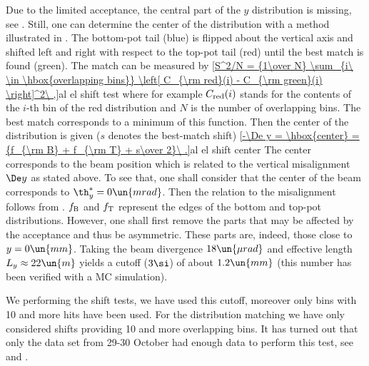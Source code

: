 
Due to the limited acceptance, the central part of the $y$ distribution is missing, see . Still, one can determine the center of the distribution with a method illustrated in . The bottom-pot tail (blue) is flipped about the vertical axis and shifted left and right with respect to the top-pot tail (red) until the best match is found (green). The match can be measured by
\eqref{S^2/N = {1\over N} \sum_{i\ \in \hbox{overlapping bins}} \left[ C_{\rm red}(i) - C_{\rm green}(i) \right]^2\ ,}{al el shift test}
where for example $C_{\rm red}(i)$ stands for the contents of the $i$-th bin of the red distribution and $N$ is the number of overlapping bins. The best match corresponds to a minimum of this function. Then the center of the distribution is given ($s$ denotes the best-match shift)
\eqref{-\De y = \hbox{center} = {f_{\rm B} + f_{\rm T} + s\over 2}\ .}{al el shift center}
The center corresponds to the beam position which is related to the vertical misalignment $\De y$ as stated above. To see that, one shall consider that the center of the beam corresponds to $\th_y^* = 0\un{mrad}$. Then the relation to the misalignment follows from . $f_{\rm B}$ and $f_{\rm T}$ represent the edges of the bottom and top-pot distributions. However, one shall first remove the parts that may be affected by the acceptance and thus be asymmetric. These parts are, indeed, those close to $y=0\un{mm}$. Taking the beam divergence $18\un{\mu rad}$ and effective length $L_y\approx 22\un{m}$ yields a cutoff ($3\si$) of about $1.2\un{mm}$ (this number has been verified with a MC simulation).

We performing the shift tests, we have used this cutoff, moreover only bins with 10 and more hits have been used. For the distribution matching we have only considered shifts providing 10 and more overlapping bins. It has turned out that only the data set from 29-30 October had enough data to perform this test, see  and .



